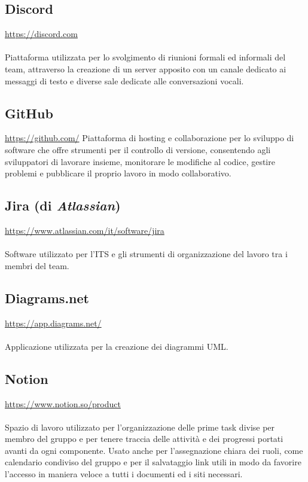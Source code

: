 \documentclass[10pt, a4paper]{article}
\begin{document}
\subsection{Discord}
\href{https://discord.com}{https://discord.com}\\\\
Piattaforma utilizzata per lo svolgimento di riunioni formali ed informali del team, attraverso la creazione di un server apposito con un canale dedicato ai messaggi di testo e diverse sale dedicate alle conversazioni vocali.

\subsection{GitHub}
\href{https://github.com/}{https://github.com/}
Piattaforma di hosting e collaborazione per lo sviluppo di software che offre strumenti per il controllo di versione, consentendo agli sviluppatori di lavorare insieme, monitorare le modifiche al codice, gestire problemi e pubblicare il proprio lavoro in modo collaborativo.

\subsection{Jira (di \textit{Atlassian})}
\href{https://www.atlassian.com/it/software/jira}{https://www.atlassian.com/it/software/jira}\\\\
Software utilizzato per l'ITS e gli strumenti di organizzazione del lavoro tra i membri del team.

\subsection{Diagrams.net}
\href{https://app.diagrams.net/}{https://app.diagrams.net/}\\\\
Applicazione utilizzata per la creazione dei diagrammi UML.

\subsection{Notion}
\href{https://www.notion.so/product}{https://www.notion.so/product}\\\\
Spazio di lavoro utilizzato per l'organizzazione delle prime task divise per membro del gruppo e per tenere traccia delle attività e dei progressi portati avanti da ogni componente. Usato anche per l'assegnazione chiara dei ruoli, come calendario condiviso del gruppo e per il salvataggio link utili in modo da favorire l'accesso in maniera veloce a tutti i documenti ed i siti necessari.
\end{document}
